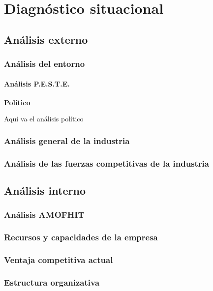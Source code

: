 \chapter{Diagnóstico situacional}

\section{Análisis externo}

\subsection{Análisis del entorno}
\subsubsection{Análisis P.E.S.T.E.}
\textbf{Político}

Aquí va el análisis político
\subsection{Análisis general de la industria}
\subsection{Análisis de las fuerzas competitivas de la industria}

\section{Análisis interno}

\subsection{Análisis AMOFHIT}
\subsection{Recursos y capacidades de la empresa}
\subsection{Ventaja competitiva actual}
\subsection{Estructura organizativa}